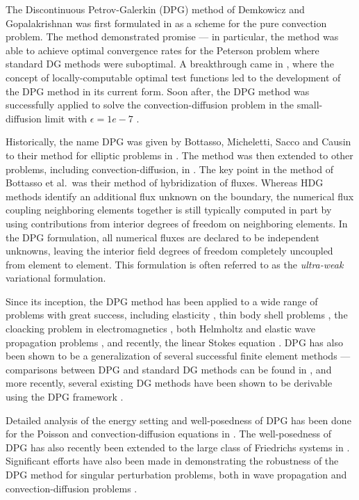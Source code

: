 The Discontinuous Petrov-Galerkin (DPG) method of Demkowicz and Gopalakrishnan was first formulated in \cite{DPG1} as a scheme for the pure convection problem. The method demonstrated promise --- in particular, the method was able to achieve optimal convergence rates for the Peterson problem where standard DG methods were suboptimal. A breakthrough came in \cite{DPG2}, where the concept of locally-computable optimal test functions led to the development of the DPG method in its current form. Soon after, the DPG method was successfully applied to solve the convection-diffusion problem in the small-diffusion limit with $\epsilon = 1e-7$ \cite{DPG2,DPG3}. 

Historically, the name DPG was given by Bottasso, Micheletti, Sacco and Causin to their method for elliptic problems in \cite{BottassoMichelettiSacco02}. The method was then extended to other problems, including convection-diffusion, in \cite{BottassoMichelettiSacco05,CausinSacco05,CausinSaccoBottasso05}. The key point in the method of Bottasso et al.\ was their method of hybridization of fluxes. Whereas HDG methods identify an additional flux unknown on the boundary, the numerical flux coupling neighboring elements together is still typically computed in part by using contributions from interior degrees of freedom on neighboring elements. In the DPG formulation, all numerical fluxes are declared to be independent unknowns, leaving the interior field degrees of freedom completely uncoupled from element to element. This formulation is often referred to as the \emph{ultra-weak} variational formulation. 

Since its inception, the DPG method has been applied to a wide range of problems with great success, including elasticity \cite{DPGElasLocking}, thin body shell problems \cite{DPGElas}, the cloacking problem in electromagnetics \cite{DPGcloak}, both Helmholtz and elastic wave propagation problems \cite{DPG4}, and recently, the linear Stokes equation \cite{stokesDPG}. DPG has also been shown to be a generalization of several successful finite element methods --- comparisons between DPG and standard DG methods can be found in \cite{DPG1}, and more recently, several existing DG methods have been shown to be derivable using the DPG framework \cite{Bui-ThanhDemkowiczGhattas11a,DGDPG}. 

Detailed analysis of the energy setting and well-posedness of DPG has been done for the Poisson and convection-diffusion equations in \cite{analysisDPG}. The well-posedness of DPG has also recently been extended to the large class of Friedrichs systems in \cite{Bui-ThanhDemkowiczGhattas11b}. Significant efforts have also been made in demonstrating the robustness of the DPG method for singular perturbation problems, both in wave propagation \cite{DPG4,DPGwave} and convection-diffusion problems \cite{DPGrobustness, DPGrobustness2}. 

